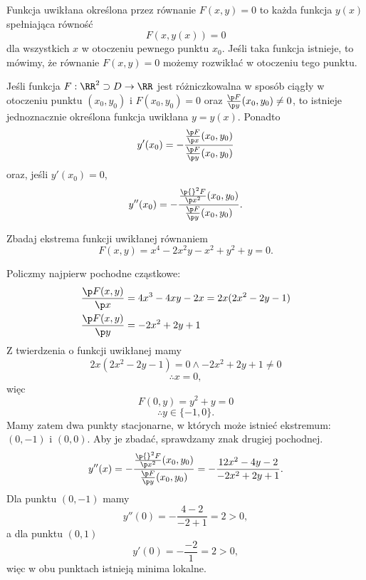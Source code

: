 \begin{definition}
    Funkcja uwikłana określona przez równanie $F(x, y) = 0$ to każda funkcja $y(x)$ spełniająca równość
    \[ F(x, y(x)) = 0 \]
    dla wszystkich $x$ w otoczeniu pewnego punktu $x_0$. Jeśli taka funkcja istnieje, to mówimy, że równanie $F(x, y) = 0$ możemy rozwikłać w otoczeniu tego punktu.
\end{definition}

\begin{theorem}
    Jeśli funkcja $F : \RR^2 \supset D \to \RR$ jest różniczkowalna w sposób ciągły w otoczeniu punktu $(x_0, y_0)$ i $F(x_0, y_0) = 0$ oraz $\frac{\p F}{\p y}(x_0, y_0) \neq 0$, to istnieje jednoznacznie określona funkcja uwikłana $y = y(x)$. Ponadto
    \[ y'(x_0) = -\frac{\frac{\p F}{\p x}(x_0, y_0)}{\frac{\p F}{\p y}(x_0, y_0)} \]
    oraz, jeśli $y'(x_0) = 0$,
    \[ y''(x_0) = -\frac{\frac{\p{}^2 F}{\p x^2}(x_0, y_0)}{\frac{\p F}{\p y}(x_0, y_0)}. \]
\end{theorem}

\begin{example}
    Zbadaj ekstrema funkcji uwikłanej równaniem
    \[ F(x, y) = x^4 - 2x^2y - x^2 + y^2 + y = 0. \]
\end{example}
\begin{solution}
    Policzmy najpierw pochodne cząstkowe:
    \begin{align*}
        \frac{\p F(x, y)}{\p x} &= 4x^3 - 4xy - 2x = 2x(2x^2 - 2y - 1) \\
        \frac{\p F(x, y)}{\p y} &= -2x^2 + 2y + 1
    \end{align*}
    Z twierdzenia o funkcji uwikłanej mamy
    \[ 2x(2x^2 - 2y - 1) = 0 \land -2x^2 + 2y + 1 \neq 0 \]
    \[ \therefore x = 0, \]
    więc
    \[ F(0, y) = y^2 + y = 0 \]
    \[ \therefore y \in \{-1, 0\}. \]
    Mamy zatem dwa punkty stacjonarne, w których może istnieć ekstremum: $(0, -1)$ i $(0, 0)$. Aby je zbadać, sprawdzamy znak drugiej pochodnej.
    \[ y''(x) = -\frac{\frac{\p{}^2 F}{\p x^2}(x_0, y_0)}{\frac{\p F}{\p y}(x_0, y_0)} = -\frac{12x^2 - 4y - 2}{-2x^2 + 2y + 1}. \]
    Dla punktu $(0, -1)$ mamy
    \[ y''(0) = -\frac{4 - 2}{-2 + 1} = 2 > 0, \]
    a dla punktu $(0, 1)$
    \[ y'(0) = -\frac{-2}{1} = 2 > 0, \]
    więc w obu punktach istnieją minima lokalne.
\end{solution}